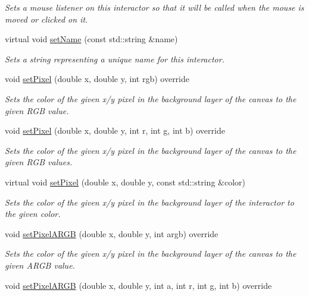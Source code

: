 \begin{DoxyCompactItemize}
\begin{DoxyCompactList}\small\item\em Sets a mouse listener on this interactor so that it will be called when the mouse is moved or clicked on it. \end{DoxyCompactList}\item 
virtual void \mbox{\hyperlink{classGInteractor_a9d3a2685df23b5e7cbf59c19c4a1f9b5}{set\+Name}} (const std\+::string \&name)
\begin{DoxyCompactList}\small\item\em Sets a string representing a unique name for this interactor. \end{DoxyCompactList}\item 
void \mbox{\hyperlink{classGCanvas_a05b3441e912e4c0ed45e9ed43bb745d1}{set\+Pixel}} (double x, double y, int rgb) override
\begin{DoxyCompactList}\small\item\em Sets the color of the given x/y pixel in the background layer of the canvas to the given R\+GB value. \end{DoxyCompactList}\item 
void \mbox{\hyperlink{classGCanvas_a92c3e3ef930ae7742ad384af28aac241}{set\+Pixel}} (double x, double y, int r, int g, int b) override
\begin{DoxyCompactList}\small\item\em Sets the color of the given x/y pixel in the background layer of the canvas to the given R\+GB values. \end{DoxyCompactList}\item 
virtual void \mbox{\hyperlink{classGDrawingSurface_a09f9640e4ff7388dcfc391efd88d2415}{set\+Pixel}} (double x, double y, const std\+::string \&color)
\begin{DoxyCompactList}\small\item\em Sets the color of the given x/y pixel in the background layer of the interactor to the given color. \end{DoxyCompactList}\item 
void \mbox{\hyperlink{classGCanvas_ae189342d4b4235efa2ece08e08758499}{set\+Pixel\+A\+R\+GB}} (double x, double y, int argb) override
\begin{DoxyCompactList}\small\item\em Sets the color of the given x/y pixel in the background layer of the canvas to the given A\+R\+GB value. \end{DoxyCompactList}\item 
void \mbox{\hyperlink{classGCanvas_a2d22778c4fdce45bb2df60518000c5ad}{set\+Pixel\+A\+R\+GB}} (double x, double y, int a, int r, int g, int b) override

\end{DoxyCompactItemize}
